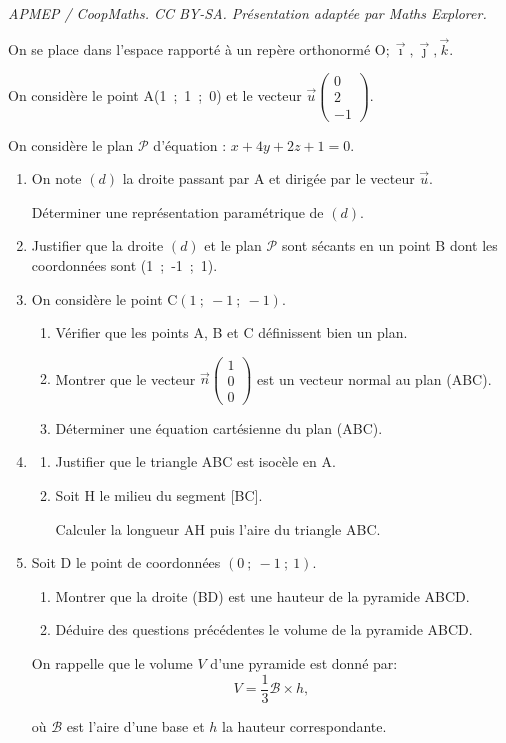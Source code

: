 \documentclass[10pt]{article}
\providecommand{\vect}[1]{\overrightarrow{#1}}
\providecommand{\Oijk}{\(\mathrm{O};\vec{\imath},\vec{\jmath},\vec{k}\)}
\begin{document}
\noindent\textit{APMEP / CoopMaths. CC BY-SA. Présentation adaptée par Maths Explorer.}\par\medskip
\medskip

On se place dans l'espace rapporté à un repère orthonormé \Oijk.

On considère le point A(1~;~1~;~0) et le vecteur $\vect{u}\begin{pmatrix}0\\2\\- 1\end{pmatrix}$.

On considère le plan $\mathcal{P}$ d'équation : $x + 4y + 2z + 1 = 0$.

\medskip

\begin{enumerate}
\item On note $(d)$ la droite passant par A et dirigée par le vecteur $\vect{u}$.

Déterminer une représentation paramétrique de $(d)$.
\item Justifier que la droite $(d)$ et le plan $\mathcal{P}$ sont sécants en un point B dont les coordonnées sont (1~;~-1~;~1).
\item On considère le point C$(1~;~-1~;~-1)$.
	\begin{enumerate}
		\item Vérifier que les points A, B et C définissent bien un plan.
		\item Montrer que le vecteur $\vect{n}\begin{pmatrix}1\\0\\0\end{pmatrix}$ est un vecteur normal au plan (ABC).
		\item Déterminer une équation cartésienne du plan (ABC).
	\end{enumerate}
\item 
	\begin{enumerate}
		\item Justifier que le triangle ABC est isocèle en A.
		\item Soit H le milieu du segment [BC].
		
Calculer la longueur AH puis l'aire du triangle ABC.
	\end{enumerate}
\item Soit D le point de coordonnées $(0~;~-1~;~1)$.
	\begin{enumerate}
		\item Montrer que la droite (BD) est une hauteur de la pyramide ABCD.
		\item Déduire des questions précédentes le volume de la pyramide ABCD.
	\end{enumerate}
	
\begin{center}On rappelle que le volume $V$ d'une pyramide est donné par:
	\[V = \dfrac13 \mathcal{B} \times h,\]

où $\mathcal{B}$ est l'aire d'une base et $h$ la hauteur correspondante.\end{center}
\end{enumerate}

\bigskip
\end{document}
